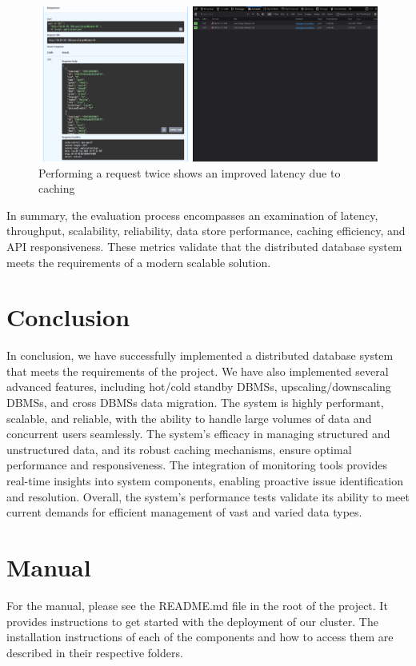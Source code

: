\documentclass{report}
\begin{document}
    \begin{figure}[H]
        \centering
        \includegraphics[width=\textwidth]{images/cache}
        \caption{Performing a request twice shows an improved latency due to caching}
        \label{fig:cache}
    \end{figure}

    In summary, the evaluation process encompasses an examination of latency, throughput, scalability, reliability, data store performance, caching efficiency, and API responsiveness. These metrics validate that the distributed database system meets the requirements of a modern scalable solution.

    \section{Conclusion}
    In conclusion, we have successfully implemented a distributed database system that meets the requirements of the project. We have also implemented several advanced features, including hot/cold standby DBMSs, upscaling/downscaling DBMSs, and cross DBMSs data migration. The system is highly performant, scalable, and reliable, with the ability to handle large volumes of data and concurrent users seamlessly. The system's efficacy in managing structured and unstructured data, and its robust caching mechanisms, ensure optimal performance and responsiveness. The integration of monitoring tools provides real-time insights into system components, enabling proactive issue identification and resolution. Overall, the system's performance tests validate its ability to meet current demands for efficient management of vast and varied data types.

    \section{Manual}
    For the manual, please see the README.md file in the root of the project. It provides instructions to get started with the deployment of our cluster. The installation instructions of each of the components and how to access them are described in their respective folders.
\end{document}
